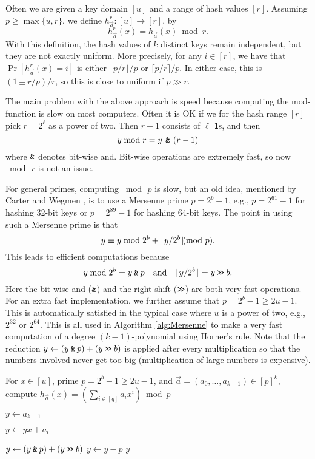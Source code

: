 Often we are given a key domain $[u]$ and a range of hash values $[r]$. Assuming $p\geq \max\{u,r\}$, we define
$h^r_{\vec a}:[u]\to[r]$, by
\[h^r_{\vec a}(x)=h_{\vec a}(x)\bmod r.\]
With this definition, the hash values of $k$ distinct keys 
remain independent, but they are not exactly uniform. More
precisely, for any $i\in[r]$, we have that
$\Pr[h_{\vec a}^r(x)=i]$ is
either $\lfloor p/r\rfloor/p$ or $\lceil p/r\rceil/p$. In
either case, this is $(1\pm r/p)/r$, so this is close to uniform if
$p\gg r$.


The main problem with the above approach is speed because computing
the mod-function is slow on most computers. Often it
is OK if we for the hash range $[r]$ pick $r=2^\ell$ as a power of two.
Then $r-1$ consists of $\ell$ \texttt1s, and then 
\[y\bmod r=y\,\mathbin{\texttt{\&}} \,(r-1)\]
where $\mathbin{\texttt{\&}}$ denotes bit-wise {\sc and}. Bit-wise operations are
extremely fast, so now $\bmod\,r$ is not an issue.

For general primes, computing $\bmod\,p$ is slow, but an old idea,
mentioned by Carter and Wegmen \cite{carter77universal}, is to use a
Mersenne prime $p=2^b-1$, e.g., $p=2^{61}-1$ for hashing 32-bit keys or
$p=2^{89}-1$ for hashing 64-bit keys. The point in using such a Mersenne prime
is that
\begin{equation}\label{eq:Mersenne}
   y\equiv y\bmod 2^{b}+\floor{y/2^b}\ppmod {p}.
\end{equation}
This leads to efficient computations because 
\[y\bmod 2^{b}=y\mathbin{\texttt{\&}} p\quad\textnormal{and}\quad\lfloor {y/2^b} \rfloor=y\mathbin{\texttt{>\!>}} b.\]
Here the bit-wise {\sc and} ($\mathbin{\texttt{\&}}$) and the right-shift ($\mathbin{\texttt{>\!>}}$) are
both very fast operations. For
an extra fast implementation, we further assume that $p=2^b-1\geq 2u-1$.
This is automatically satisfied in the typical case where $u$ is a power
of two, e.g., $2^{32}$ or $2^{64}$. This is all used in Algorithm \ref{alg:Mersenne} to make a very fast
computation of a degree $(k-1)$-polynomial using Horner's rule. Note that
the reduction $y\gets (y\mathbin{\texttt{\&}} p)+(y \mathbin{\texttt{>\!>}} b)$ is applied after
every multiplication so that the numbers involved never get too big (multiplication of large numbers is expensive).
\begin{algorithm}\label{alg:Mersenne}
   \caption{
      For $x\in [u]$, prime $p=2^b-1\geq 2u-1$,
      and $\vec a=(a_0,\ldots,a_{k-1})\in[p]^k$,
      compute $h_{\vec a}(x)=\left(\sum_{i\in[q]}a_i x^i\right)\bmod p$
   }
   \begin{algorithmic}[1]
      \State $y\gets a_{k-1}$

      \State $y\gets yx+a_i$

      \State $y\gets (y\mathbin{\texttt{\&}} p)+(y\mathbin{\texttt{>\!>}} b)$
      \EndFor
      \State $y\gets y-p$
      \EndIf
      \State \Return $y$
   \end{algorithmic}
\end{algorithm}

